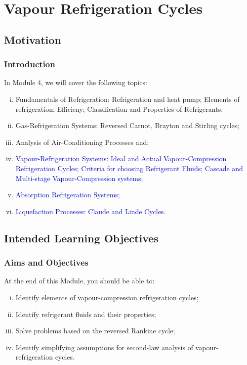 \documentclass[10pt,compress]{beamer}
\begin{document}
\section{Vapour Refrigeration Cycles}

\subsection{Motivation}
\begin{frame}
 \frametitle{Introduction}
  In Module 4, we will cover the following topics:
  \begin{enumerate}[(i)]
   \item <1-> Fundamentals of Refrigeration: Refrigeration and heat pump; Elements of refrigeration; Efficieny; Classification and Properties of Refrigerants;
   \item <1-> Gas-Refrigeration Systems: Reversed Carnot, Brayton and Stirling cycles;
   \item <1-> Analysis of Air-Conditioning Processes and;
   \item <2-> \textcolor{blue}{Vapour-Refrigeration Systems: Ideal and Actual Vapour-Compression Refrigeration Cycles; Criteria for choosing Refrigerant Fluids; Cascade and Multi-stage Vapour-Compression systems;}
   \item <3-> \textcolor{blue}{Absorption Refrigeration Systems;}
   \item <3-> \textcolor{blue}{Liquefaction Processes: Claude and Linde Cycles.}
  \end{enumerate}
\end{frame}

\subsection{Intended Learning Objectives}
\begin{frame}
 \frametitle{Aims and Objectives}
  At the end of this Module, you should be able to:
  \begin{enumerate}[(i)]
   \item <1-> Identify elements of vapour-compression refrigeration cycles;
   \item <2-> Identify refrigerant fluids and their properties;
   \item <3-> Solve problems based on the reversed Rankine cycle;
   \item <4-> Identify simplifying assumptions for second-law analysis of vapour-refrigeration cycles.
  \end{enumerate}
\end{frame}
\end{document}
